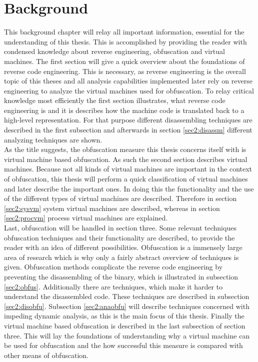 \documentclass[10pt,twoside,a4paper,bibliography=totoc]{scrbook}
\begin{document}
\chapter{Background}
\label{sec2:background}
This background chapter will relay all important information, essential for the understanding of this thesis.
This is accomplished by providing the reader with condensed knowledge about reverse engineering, obfuscation and virtual machines.
The first section will give a quick overview about the foundations of reverse code engineering. This is necessary, as reverse engineering is the overall topic of this theses and all analysis capabilities implemented later rely on reverse engineering to analyze the virtual machines used for obfuscation. 
To relay critical knowledge most efficiently the first section illustrates, what reverse code engineering is and it is describes how the machine code is translated back to a high-level representation. 
For that purpose different disassembling techniques are described in the first subsection and afterwards in section \ref{sec2:disassm} different analyzing techniques are shown. \\
As the title suggests, the obfuscation measure this thesis concerns itself with is virtual machine based obfuscation. As such the second section describes virtual machines. Because not all kinds of virtual machines are important in the context of obfuscation, this thesis will perform a quick classification of virtual machines and later describe the important ones.
In doing this the functionality and the use of the different types of virtual machines are described. Therefore in section \ref{sec2:sysvm} system virtual machines are described, whereas in section \ref{sec2:procvm} process virtual machines are explained.  \\
Last, obfuscation will be handled in section three. Some relevant techniques obfuscation techniques and their functionality are described, to provide the reader with an idea of different possibilities. 
Obfuscation is a immensely large area of research which is why only a fairly abstract overview of techniques is given.
Obfuscation methods complicate the reverse code engineering by preventing the disassembling of the binary, which is illustrated in subsection \ref{sec2:obfus}. Additionally there are techniques, which make it harder to understand the disassembled code. These techniques are described in subsection \ref{sec2:disobfu}. Subsection \ref{sec2:anaobfu} will describe techniques concerned with impeding dynamic analysis, as this is the main focus of this thesis. 
Finally the virtual machine based obfuscation is described in the last subsection of section three. This will lay the foundations of understanding why a virtual machine can be used for obfuscation and the how successful this measure is compared with other means of obfuscation.
\end{document}
